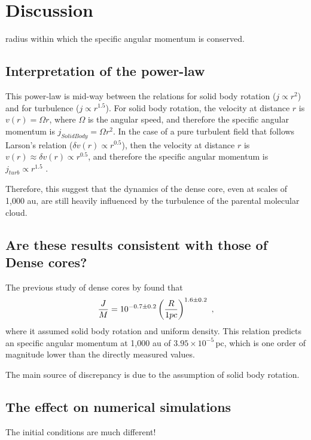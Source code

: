 \section{Discussion}


radius within which the specific angular momentum is conserved. 

\subsection{Interpretation of the power-law}
This power-law is mid-way between the relations for solid body rotation ($j\propto r^{2}$) and for turbulence ($j\propto r^{1.5}$). 
For solid body rotation, the velocity at distance $r$ is $v(r)=\Omega r$, 
where $\Omega$ is the angular speed, 
and therefore the specific angular momentum is $j_{SolidBody}=\Omega r^2$. 
In the case of a pure turbulent field that follows Larson's relation ($\delta v(r) \propto r^{0.5}$), 
then the velocity at distance $r$ is $v(r)\approx \delta v(r) \propto r^{0.5}$, 
and therefore the specific angular momentum is $j_{turb}\propto r^{1.5}$ \citep{Burkert_2000}. 

Therefore, this suggest that the dynamics of the dense core, even at scales of 1,000 au, are still 
heavily influenced by the turbulence of the parental molecular cloud.

\subsection{Are these results consistent with those of Dense cores?}
The previous study of dense cores by \cite{Goodman_1993} found that 
\begin{equation}
\frac{J}{M} = 10^{-0.7\pm0.2} \left(\frac{R}{\textrm 1 pc}\right)^{1.6\pm 0.2}~,
\end{equation}
where it assumed solid body rotation and uniform density. 
This relation predicts an specific angular momentum at 1,000 au of $3.95\times 10^{-5}$\,\kms pc, 
which is one order of magnitude lower than the directly measured values.

The main source of discrepancy is due to the assumption of solid body rotation.

\subsection{The effect on numerical simulations}
The initial conditions are much different!
 

  
  
  